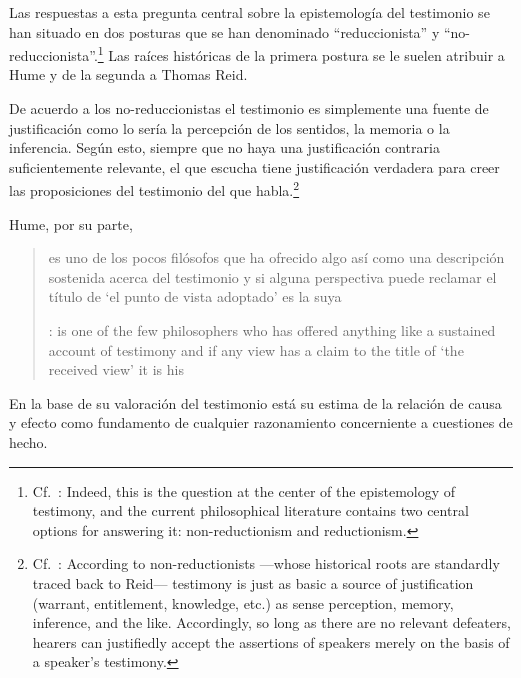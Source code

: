 Las respuestas a esta pregunta central sobre la epistemología del testimonio se
han situado en dos posturas que se han denominado \enquote{reduccionista} y
\enquote{no-reduccionista}.\footnote{Cf.~\cite[4]{lackeysosa2006eptest}: Indeed,
  this is the question at the center of the epistemology of testimony, and the
  current philosophical literature contains two central options for answering
  it: non-reductionism and reductionism.} Las raíces históricas de la primera
postura se le suelen atribuir a Hume y de la segunda a Thomas Reid.

De acuerdo a los no-reduccionistas el testimonio es simplemente una fuente de
justificación como lo sería la percepción de los sentidos, la memoria o la
inferencia. Según esto, siempre que no haya una justificación contraria
suficientemente relevante, el que escucha tiene justificación verdadera para
creer las proposiciones del testimonio del que
habla.\footnote{Cf.~\cite[4]{lackeysosa2006eptest}: According to
  non-reductionists ---whose historical roots are standardly traced back to
  Reid--- testimony is just as basic a source of justification (warrant,
  entitlement, knowledge, etc.) as sense perception, memory, inference, and the
  like. Accordingly, so long as there are no relevant defeaters, hearers can
  justifiedly accept the assertions of speakers merely on the basis of a
  speaker's testimony.}

Hume, por su parte, \blockquote[{\cite[79]{coady1992test}}: is one of the few
philosophers who has offered anything like a sustained account of testimony and
if any view has a claim to the title of `the received view' it is his]{es uno de
  los pocos filósofos que ha ofrecido algo así como una descripción sostenida
  acerca del testimonio y si alguna perspectiva puede reclamar el título de `el
  punto de vista adoptado' es la suya}. En la base de su valoración del
testimonio está su estima de la relación de causa y efecto como fundamento de
cualquier razonamiento concerniente a cuestiones de hecho.

